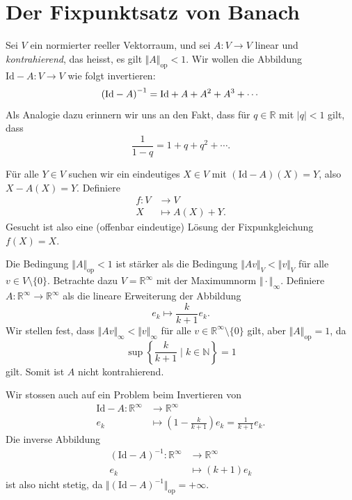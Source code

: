 \documentclass[../main.tex]{subfiles}
\begin{document}
\section{Der Fixpunktsatz von Banach}
\begin{motivation}
  Sei $V$ ein normierter reeller Vektorraum,
  und sei $A \colon V \to V$ linear und \emph{kontrahierend},
  das heisst, es gilt
  $\Vert A \Vert_{\text{op}} < 1$.
  Wir wollen die Abbildung $\text{Id} - A \colon V \to V$ wie folgt
  invertieren:
  \[
    {(\text{Id} - A)}^{-1} = \textup{Id} + A + A^2 + A^3 + \cdots
  \]
  Als Analogie dazu erinnern wir uns an den Fakt, dass
  für $q \in \mathbb{R}$ mit $|q| < 1$ gilt, dass
  \[
    \frac{1}{1-q} = 1 + q + q^2 + \cdots.
  \]

  Für alle $Y \in V$ suchen wir ein eindeutiges $X \in V$ 
  mit $(\text{Id} - A)(X) = Y$, also
  $X - A(X) = Y$.
  Definiere
  \begin{align*}
    f \colon V & \to V \\
    X & \mapsto A(X) + Y.
  \end{align*}
  Gesucht ist also eine (offenbar eindeutige) Lösung
  der Fixpunkgleichung $f(X) = X$.
\end{motivation}

\begin{remark}
  Die Bedingung $\Vert A \Vert_{\text{op}} < 1$ ist stärker als die
  Bedingung $\Vert A v \Vert_V < \Vert v \Vert_V$ für alle $v
  \in V \setminus \{0\}$.
  Betrachte dazu $V = \mathbb{R}^{\infty}$ mit der Maximumnorm
  $\Vert \cdot \Vert_{\infty}$.
  Definiere $A \colon \mathbb{R}^{\infty} \to \mathbb{R}^{\infty}$ 
  als die lineare Erweiterung der Abbildung
  \[
    e_k \mapsto \frac{k}{k+1}e_k.
  \]
  Wir stellen fest, dass $\Vert A v \Vert_{\infty} < \Vert v \Vert_{\infty}$ 
  für alle $v \in \mathbb{R}^{\infty} \setminus \{0\}$ gilt,
  aber $\Vert A \Vert_{\text{op}} = 1$, da
  \[
    \sup \left\{\frac{k}{k+1} \mid k \in \mathbb{N}\right\} = 1
  \]
  gilt. Somit ist $A$ nicht kontrahierend.
  
  Wir stossen auch auf ein Problem beim Invertieren von
  \begin{align*}
    \text{Id} - A \colon \mathbb{R}^{\infty} & \to \mathbb{R}^{\infty} \\
    e_k & \mapsto \left( 1 - \frac{k}{k+1} \right)e_k
    = \frac{1}{k+1}e_k.
  \end{align*}
  Die inverse Abbildung
  \begin{align*}
    {(\text{Id} - A)}^{-1} \colon \mathbb{R}^{\infty} & \to \mathbb{R}^{\infty} \\
    e_k & \mapsto (k+1) e_k
  \end{align*}
  ist also nicht stetig, da $\Vert {(\text{Id} - A)}^{-1} \Vert_{\text{op}}
  = +\infty$.
\end{remark}
\end{document}
